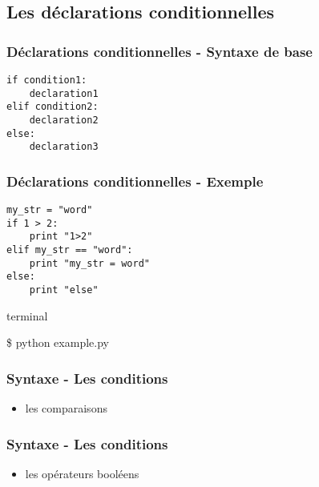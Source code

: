\subsection{Les déclarations conditionnelles}
\begin{frame}[fragile]
  \frametitle{Déclarations conditionnelles - Syntaxe de base}
  \begin{lstlisting}
if condition1:
    declaration1
elif condition2:
    declaration2
else:
    declaration3
  \end{lstlisting}
\end{frame}

\begin{frame}[fragile]
  \frametitle{Déclarations conditionnelles - Exemple}
  \begin{lstlisting}
my_str = "word"
if 1 > 2:
    print "1>2"
elif my_str == "word":
    print "my_str = word"
else:
    print "else"
  \end{lstlisting}

  \begin{beamercolorbox}{terminal}
  \begin{semiverbatim}
 \$ python example.py
  \end{semiverbatim}
  \end{beamercolorbox}

\end{frame}

\begin{frame}[fragile]
  \frametitle{Syntaxe - Les conditions}
  \begin{itemize}
    \item les comparaisons
  \end{itemize}
  \begin{ipython}
  \end{ipython}
\end{frame}


\begin{frame}[fragile]
  \frametitle{Syntaxe - Les conditions}
  \begin{itemize}
    \item les opérateurs booléens
  \end{itemize}
  \begin{ipython}
  \end{ipython}
\end{frame}

